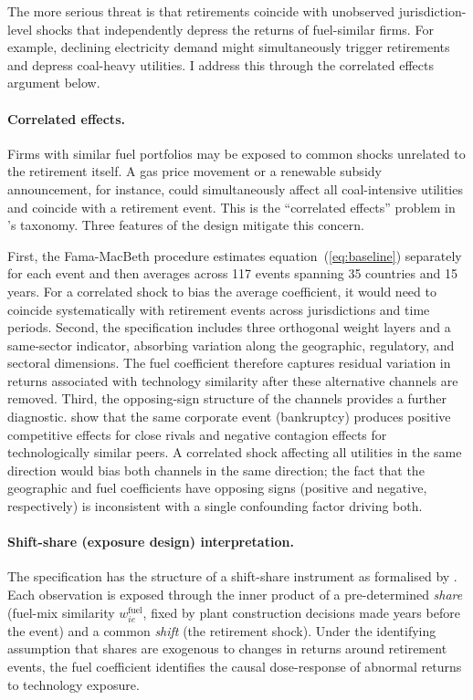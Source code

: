 \documentclass[12pt,a4paper]{article}
\begin{document}
The more serious threat is that retirements coincide with unobserved jurisdiction-level shocks that independently depress the returns of fuel-similar firms. For example, declining electricity demand might simultaneously trigger retirements and depress coal-heavy utilities. I address this through the correlated effects argument below.

\paragraph{Correlated effects.}
Firms with similar fuel portfolios may be exposed to common shocks unrelated to the retirement itself. A gas price movement or a renewable subsidy announcement, for instance, could simultaneously affect all coal-intensive utilities and coincide with a retirement event. This is the ``correlated effects'' problem in \citet{Manski1993}'s taxonomy. Three features of the design mitigate this concern.

First, the Fama-MacBeth procedure estimates equation~(\ref{eq:baseline}) separately for each event and then averages across 117 events spanning 35 countries and 15 years. For a correlated shock to bias the average coefficient, it would need to coincide systematically with retirement events across jurisdictions and time periods. Second, the specification includes three orthogonal weight layers and a same-sector indicator, absorbing variation along the geographic, regulatory, and sectoral dimensions. The fuel coefficient therefore captures residual variation in returns associated with technology similarity after these alternative channels are removed. Third, the opposing-sign structure of the channels provides a further diagnostic. \citet{LangStulz1992} show that the same corporate event (bankruptcy) produces positive competitive effects for close rivals and negative contagion effects for technologically similar peers. A correlated shock affecting all utilities in the same direction would bias both channels in the same direction; the fact that the geographic and fuel coefficients have opposing signs (positive and negative, respectively) is inconsistent with a single confounding factor driving both.

\paragraph{Shift-share (exposure design) interpretation.}
The specification has the structure of a shift-share instrument as formalised by \citet{GoldsmithPinkhamSorkinSwift2020}. Each observation is exposed through the inner product of a pre-determined \emph{share} (fuel-mix similarity $w^{\text{fuel}}_{ie}$, fixed by plant construction decisions made years before the event) and a common \emph{shift} (the retirement shock). Under the identifying assumption that shares are exogenous to changes in returns around retirement events, the fuel coefficient identifies the causal dose-response of abnormal returns to technology exposure.
\end{document}
